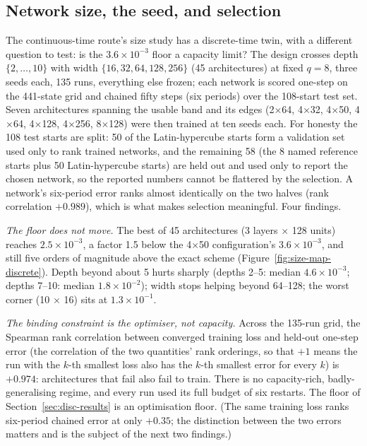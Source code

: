 \documentclass[11pt,a4paper]{article}
\begin{document}
\subsection{Network size, the seed, and selection}
\label{sec:disc-size}

The continuous-time route's size study has a discrete-time twin, with a
different question to test: is the $3.6\times10^{-3}$ floor a capacity
limit? The design crosses depth $\{2,\dots,10\}$ with width
$\{16, 32, 64, 128, 256\}$ (45 architectures) at fixed $q = 8$, three
seeds each, 135 runs, everything else frozen; each network is scored
one-step on the 441-state grid and chained fifty steps (six periods) over
the 108-start test set. Seven architectures spanning the usable band and
its edges (2$\times$64, 4$\times$32, 4$\times$50, 4$\times$64,
4$\times$128, 4$\times$256, 8$\times$128) were then trained at ten seeds
each. For honesty the 108 test starts are split: 50 of the
Latin-hypercube starts form a validation set used only to rank trained
networks, and the remaining 58 (the 8 named reference starts plus 50
Latin-hypercube starts) are held out and used only to report the chosen
network, so the reported numbers cannot be flattered by the selection. A
network's six-period error ranks almost identically on the two halves
(rank correlation $+0.989$), which is what makes selection meaningful.
Four findings.

\emph{The floor does not move.} The best of 45 architectures
(3 layers $\times$ 128 units) reaches $2.5\times10^{-3}$, a factor 1.5
below the 4$\times$50 configuration's $3.6\times10^{-3}$, and still five
orders of magnitude above the exact scheme
(Figure~\ref{fig:size-map-discrete}).
Depth beyond about 5 hurts sharply (depths 2--5: median $4.6\times10^{-3}$;
depths 7--10: median $1.8\times10^{-2}$); width stops helping beyond
64--128; the worst corner (10 $\times$ 16) sits at $1.3\times10^{-1}$.

\emph{The binding constraint is the optimiser, not capacity.} Across the
135-run grid, the Spearman rank correlation between converged training
loss and held-out one-step error (the correlation of the two quantities'
rank orderings, so that $+1$ means the run with the $k$-th smallest loss
also has the $k$-th smallest error for every $k$) is $+0.974$:
architectures that fail also fail to train. There is no capacity-rich,
badly-generalising regime, and every run used its full budget of six
restarts. The floor of Section~\ref{sec:disc-results} is an optimisation
floor. (The same training loss ranks six-period chained error at only
$+0.35$; the distinction between the two errors matters and is the
subject of the next two findings.)
\end{document}
